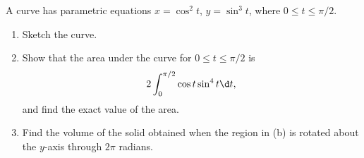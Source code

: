 \begin{problem}
    A curve has parametric equations $x = \cos^2 t$, $y = \sin^3 t$, where $0 \leq t \leq \pi/2$.
    
    \begin{enumerate}
        \item Sketch the curve.
        \item Show that the area under the curve for $0 \leq t \leq \pi/2$ is \[2\int_0^{\pi/2} \cos t \sin^4 t \d t,\] and find the exact value of the area.
        \item Find the volume of the solid obtained when the region in (b) is rotated about the $y$-axis through $2\pi$ radians.
    \end{enumerate}
\end{problem}
\clearpage
\begin{solution}
    \begin{ppart}
        \begin{center}
\end{center}
\end{ppart}
\end{solution}
